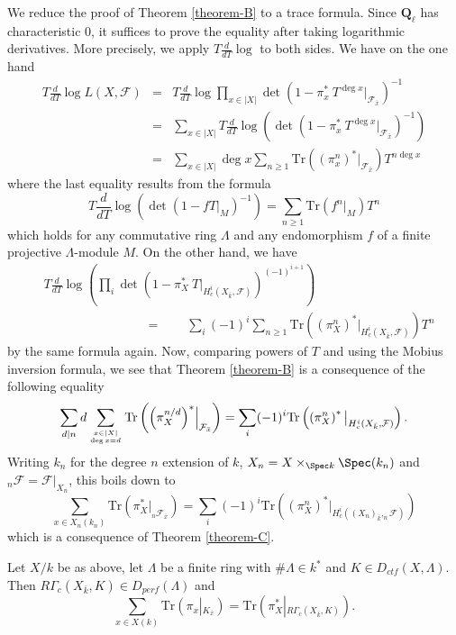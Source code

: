 \noindent
We reduce the proof of Theorem \ref{theorem-B} to a trace formula. Since
$\mathbf{Q}_\ell$ has characteristic 0, it suffices to prove the equality after
taking logarithmic derivatives. More precisely, we apply $T\frac{d}{dT} \log $
to both sides. We have on the one hand
\begin{eqnarray*}
T\frac{d}{dT}\log L(X, \mathcal{F}) & = &
T\frac{d}{dT} \log \prod_{x\in |X|} \det\left(1-\pi_x^*\ T^{\deg
x}\Big|_{\mathcal{F}_{\bar x}}\right)^{-1}\\
& = & \sum_{x\in |X|} T\frac{d}{dT} \log \left( \det\left(1-\pi_x^*\ T^{\deg
x}\Big|_{\mathcal{F}_{\bar x}}\right)^{-1}\right) \\
& = & \sum_{x \in |X|} \deg x\sum_{n \geq 1}
\text{Tr}\left({\left(\pi_x^n\right)}^*\big|_{\mathcal{F}_{\bar x}}\right)
T^{n\deg x}
\end{eqnarray*}
where the last equality results from the formula
$$
T\frac{d}{dT}\log\left(\det\left(1-fT|_M\right)^{-1}\right) = \sum_{n\geq 1}
\text{Tr}(f^n|_M)T^n
$$
which holds for any commutative ring $\Lambda$ and any endomorphism $f$ of a
finite projective $\Lambda$-module $M$. On the other hand, we have
\begin{align*}
& T\frac{d}{dT} \log\left(\prod_i \det\left(1-\pi_X^*\
T\Big|_{H_c^i\left(X_{\bar k} , \mathcal{F}\right)}\right)^{(-1)^{i+1}}\right)
\\
& \qquad\qquad\qquad \qquad = \qquad
\sum_i (-1)^i \sum_{n\geq 1}
\text{Tr}\left({\left(\pi_X^n\right)}^*\big|_{H_c^i(X_{\bar k},
\mathcal{F})}\right) T^n
\end{align*}
by the same formula again. Now, comparing powers of $T$ and using the Mobius
inversion formula, we see that Theorem \ref{theorem-B} is a consequence of the
following equality
$$
\sum_{d | n} d \sum_{x\in |X| \atop \deg x = d} \text{Tr} \left( {\left(
\pi_X^{n/d} \right)}^* \Big|_{\mathcal{F}_{\bar x}} \right)
=
\sum_i (-1)^i \text{Tr}\left(\left(\pi^n_X\right)^*\big|_{H^i_c(X_{\bar k},
\mathcal{F})} \right).
$$
Writing $k_n$ for the degree $n$ extension of $k$, $X_n = X \times_{\Spec
k} \Spec(k_n)$ and $_n \mathcal{F} = \mathcal{F}|_{X_n}$, this boils down
to
$$
\sum_{x \in X_n(k_n)} \text{Tr}\left( \pi_X^*\big|_{_n\mathcal{F}_{\bar x}}
\right)
=
\sum_i (-1)^i \text{Tr}\left(\left(\pi^n_X\right)^*\big|_{H^i_c({(X_n)}_{\bar
k}, _n\mathcal{F})} \right)
$$
which is a consequence of Theorem \ref{theorem-C}.



\begin{theorem}
\label{theorem-D}
Let $X/k$ be as above, let $\Lambda$ be a finite ring with $\#\Lambda \in k^*$
and $K\in D_{ctf}(X, \Lambda)$. Then $R\Gamma_c(X_{\bar k}, K)\in
D_{perf}(\Lambda)$ and
$$
\sum_{x\in X(k)}\text{Tr}\left(\pi_x\left|_{K_{\bar x}}\right.\right) =
\text{Tr}\left(\pi_X^*\left|_{R\Gamma_c(X_{\bar k}, K )}\right.\right).
$$
\end{theorem}

